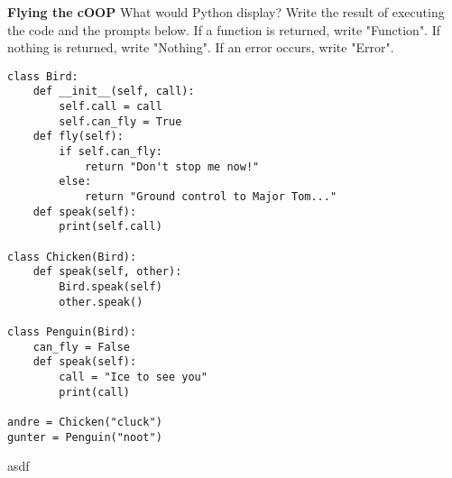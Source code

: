 \twocolumn
\begin{blocksection}

\question \textbf{Flying the cOOP} What would Python display? Write the result of executing the code and the prompts below. If a function is returned, write "Function". If nothing is returned, write "Nothing". If an error occurs, write "Error".

\vspace{2\baselineskip}

\begin{lstlisting}
class Bird:
    def __init__(self, call):
        self.call = call
        self.can_fly = True
    def fly(self):
        if self.can_fly:
            return "Don't stop me now!"
        else:
            return "Ground control to Major Tom..."
    def speak(self):
        print(self.call)

class Chicken(Bird):
    def speak(self, other):
        Bird.speak(self)
        other.speak()

class Penguin(Bird):
    can_fly = False
    def speak(self):
        call = "Ice to see you"
        print(call)

andre = Chicken("cluck")
gunter = Penguin("noot")
\end{lstlisting}
asdf
\end{blocksection}

